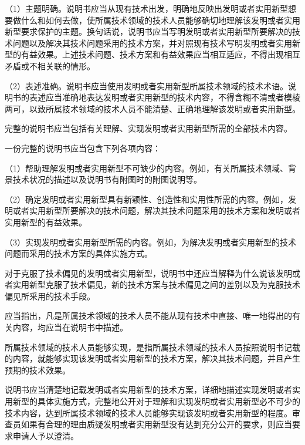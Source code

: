 {\setlength{\parindent}{17.1bp}（1）主题明确。说明书应当从现有技术出发，明确地反映出发明或者实用新型想要做什么和如何去做，使所属技术领域的技术人员能够确切地理解该发明或者实用新型要求保护的主题。换句话说，说明书应当写明发明或者实用新型所要解决的技术问题以及解决其技术问题采用的技术方案，并对照现有技术写明发明或者实用新型的有益效果。上述技术问题、技术方案和有益效果应当相互适应，不得出现相互矛盾或不相关联的情形。\par}

{\setlength{\parindent}{17.1bp}（2）表述准确。说明书应当使用发明或者实用新型所属技术领域的技术术语。说明书的表述应当准确地表达发明或者实用新型的技术内容，不得含糊不清或者模棱两可，以致所属技术领域的技术人员不能清楚、正确地理解该发明或者实用新型。\par}

完整的说明书应当包括有关理解、实现发明或者实用新型所需的全部技术内容。

一份完整的说明书应当包含下列各项内容：

{\setlength{\parindent}{17.1bp}（1）帮助理解发明或者实用新型不可缺少的内容。例如，有关所属技术领域、背景技术状况的描述以及说明书有附图时的附图说明等。\par}

{\setlength{\parindent}{17.1bp}（2）确定发明或者实用新型具有新颖性、创造性和实用性所需的内容。例如，发明或者实用新型所要解决的技术问题，解决其技术问题采用的技术方案和发明或者实用新型的有益效果。\par}

{\setlength{\parindent}{17.1bp}（3）实现发明或者实用新型所需的内容。例如，为解决发明或者实用新型的技术问题而采用的技术方案的具体实施方式。\par}

对于克服了技术偏见的发明或者实用新型，说明书中还应当解释为什么说该发明或者实用新型克服了技术偏见，新的技术方案与技术偏见之间的差别以及为克服技术偏见所采用的技术手段。

应当指出，凡是所属技术领域的技术人员不能从现有技术中直接、唯一地得出的有关内容，均应当在说明书中描述。

所属技术领域的技术人员能够实现，是指所属技术领域的技术人员按照说明书记载的内容，就能够实现该发明或者实用新型的技术方案，解决其技术问题，并且产生预期的技术效果。

说明书应当清楚地记载发明或者实用新型的技术方案，详细地描述实现发明或者实用新型的具体实施方式，完整地公开对于理解和实现发明或者实用新型必不可少的技术内容，达到所属技术领域的技术人员能够实现该发明或者实用新型的程度。审查员如果有合理的理由质疑发明或者实用新型没有达到充分公开的要求，则应当要求申请人予以澄清。

